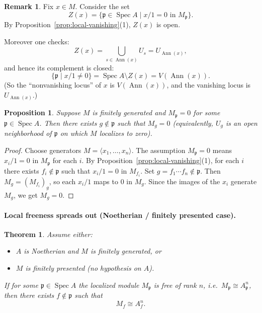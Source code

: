 \documentclass[11pt,a4paper]{article}
\theoremstyle{definition}
\newtheorem{remark}[definition]{Remark}
\theoremstyle{plain}
\newtheorem{theorem}[definition]{Theorem}
\newtheorem{proposition}[definition]{Proposition}
\theoremstyle{remark}
\newcommand{\Ann}{\operatorname{Ann}}
\newcommand{\Spec}{\operatorname{Spec}}
\begin{document}
\begin{remark}\label{rem:ann-support}
Fix $x\in M$. Consider the set
\[
Z(x)=\{\mathfrak p\in \Spec A \mid x/1=0\text{ in }M_{\mathfrak p}\}.
\]
By Proposition~\ref{prop:local-vanishing}(1), $Z(x)$ is open.

Moreover one checks:
\[
Z(x)=\bigcup_{s\in \Ann(x)} U_{s} = U_{\Ann(x)},
\]
and hence its complement is closed:
\[
\{\mathfrak p\mid x/1\neq 0\} = \Spec A\setminus Z(x)=V(\Ann(x)).
\]
(So the “nonvanishing locus” of $x$ is $V(\Ann(x))$, and the vanishing locus is $U_{\Ann(x)}$.)
\end{remark}

\begin{proposition}\label{prop:fg-local-zero}
Suppose $M$ is finitely generated and $M_{\mathfrak p}=0$ for some $\mathfrak p\in \Spec A$.
Then there exists $g\notin\mathfrak p$ such that $M_g=0$ (equivalently, $U_g$ is an open
neighborhood of $\mathfrak p$ on which $M$ localizes to zero).
\end{proposition}

\begin{proof}
Choose generators $M=\langle x_1,\dots,x_n\rangle$. The assumption $M_{\mathfrak p}=0$
means $x_i/1=0$ in $M_{\mathfrak p}$ for each $i$. By
Proposition~\ref{prop:local-vanishing}(1), for each $i$ there exists $f_i\notin\mathfrak p$
such that $x_i/1=0$ in $M_{f_i}$. Set $g=f_1\cdots f_n\notin \mathfrak p$.
Then $M_g=(M_{f_i})_{g}$, so each $x_i/1$ maps to $0$ in $M_g$.
Since the images of the $x_i$ generate $M_g$, we get $M_g=0$.
\end{proof}

\paragraph{Local freeness spreads out (Noetherian / finitely presented case).}
\begin{theorem}\label{thm:spread-out-free}
Assume either:
\begin{itemize}
\item $A$ is Noetherian and $M$ is finitely generated, \quad or
\item $M$ is finitely presented (no hypothesis on $A$).
\end{itemize}
If for some $\mathfrak p\in \Spec A$ the localized module $M_{\mathfrak p}$ is free of rank $n$,
i.e.\ $M_{\mathfrak p}\cong A_{\mathfrak p}^n$, then there exists $f\notin\mathfrak p$ such that
\[
M_f \cong A_f^n.
\]
\end{theorem}
\end{document}
